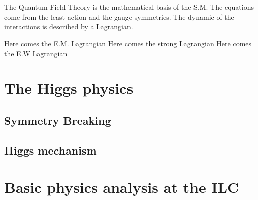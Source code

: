     The Quantum Field Theory is the mathematical basis of the S.M.
    The equations come from the least action and the gauge symmetries. 
    The dynamic of the interactions is described by a Lagrangian.

    Here comes the E.M. Lagrangian
    Here comes the strong Lagrangian
    Here comes the E.W Lagrangian

  \section{The Higgs physics}

    \subsection{Symmetry Breaking}

    \subsection{Higgs mechanism}

  \section{Basic physics analysis at the ILC}
